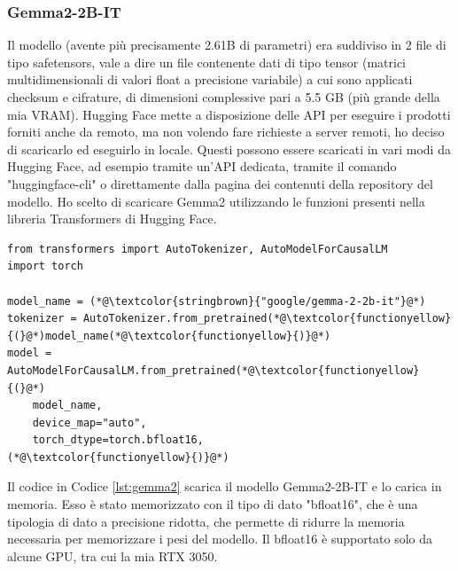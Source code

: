 \subsubsection{Gemma2-2B-IT}
Il modello (avente più precisamente 2.61B di parametri) era suddiviso in 2 file di tipo safetensors, vale a dire un file contenente dati di tipo tensor (matrici multidimensionali di valori float a precisione variabile) a cui sono applicati checksum e cifrature, di dimensioni complessive pari a 5.5 GB (più grande della mia VRAM). Hugging Face mette a disposizione delle API per eseguire i prodotti forniti anche da remoto, ma non volendo fare richieste a server remoti, ho deciso di scaricarlo ed eseguirlo in locale. Questi possono essere scaricati in vari modi da Hugging Face, ad esempio tramite un'API dedicata, tramite il comando "huggingface-cli" o direttamente dalla pagina dei contenuti della repository del modello. Ho scelto di scaricare Gemma2 utilizzando le funzioni presenti nella libreria Transformers di Hugging Face.
\begin{lstlisting}[label=lst:gemma2, caption={Installazione di Gemma2}]
from transformers import AutoTokenizer, AutoModelForCausalLM
import torch

model_name = (*@\textcolor{stringbrown}{"google/gemma-2-2b-it"}@*)
tokenizer = AutoTokenizer.from_pretrained(*@\textcolor{functionyellow}{(}@*)model_name(*@\textcolor{functionyellow}{)}@*)
model = AutoModelForCausalLM.from_pretrained(*@\textcolor{functionyellow}{(}@*)
    model_name,
    device_map="auto",
    torch_dtype=torch.bfloat16,
(*@\textcolor{functionyellow}{)}@*)
\end{lstlisting}
Il codice in Codice \ref{lst:gemma2} scarica il modello Gemma2-2B-IT e lo carica in memoria. Esso è stato memorizzato con il tipo di dato "bfloat16", che è una tipologia di dato a precisione ridotta, che permette di ridurre la memoria necessaria per memorizzare i pesi del modello. Il bfloat16 è supportato solo da alcune GPU, tra cui la mia RTX 3050.

